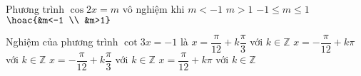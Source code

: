 \begin{ex}%
	Phương trình $\cos2x=m$ vô nghiệm khi
	\choice
	{$m<-1$}
	{$m>1$}
	{$-1\le m\le 1$}
	{\True $\hoac{&m<-1 \\ &m>1}$}
\end{ex}%
\begin{ex}%
Nghiệm của phương trình $\cot 3x=-1$ là
\choice
{$x=\dfrac{\pi}{12}+k\dfrac{\pi}{3}$ với $k\in\mathbb{Z}$}
{$x=-\dfrac{\pi}{12}+k\pi$  với $k\in\mathbb{Z}$}
{\True $x=-\dfrac{\pi}{12}+k\dfrac{\pi}{3}$ với $k\in\mathbb{Z}$}
{$x=\dfrac{\pi}{12}+k\pi$  với $k\in\mathbb{Z}$}
\end{ex}